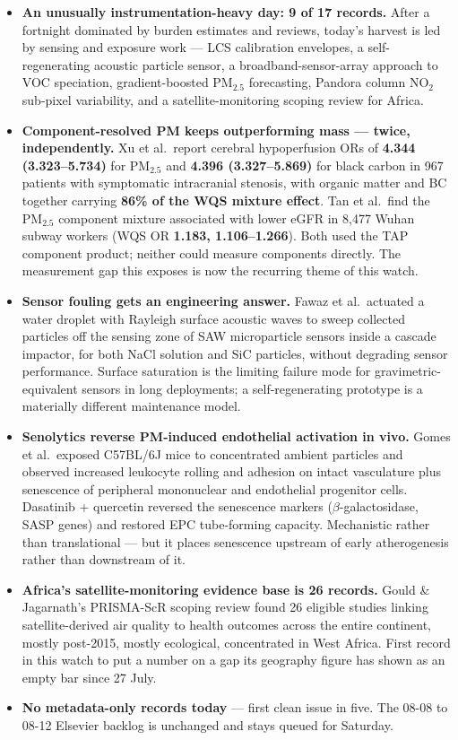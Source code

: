 \documentclass[10pt]{article}
\begin{document}
\footnotesize
\begin{itemize}
\item \textbf{An unusually instrumentation-heavy day: 9 of 17 records.} After a fortnight
dominated by burden estimates and reviews, today's harvest is led by sensing and exposure
work --- LCS calibration envelopes, a self-regenerating acoustic particle sensor, a
broadband-sensor-array approach to VOC speciation, gradient-boosted PM$_{2.5}$
forecasting, Pandora column NO$_2$ sub-pixel variability, and a satellite-monitoring
scoping review for Africa.

\item \textbf{Component-resolved PM keeps outperforming mass --- twice, independently.}
Xu et al.\ report cerebral hypoperfusion ORs of \textbf{4.344 (3.323--5.734)} for
PM$_{2.5}$ and \textbf{4.396 (3.327--5.869)} for black carbon in 967 patients with
symptomatic intracranial stenosis, with organic matter and BC together carrying
\textbf{86\% of the WQS mixture effect}. Tan et al.\ find the PM$_{2.5}$ component
mixture associated with lower eGFR in 8{,}477 Wuhan subway workers (WQS OR \textbf{1.183,
1.106--1.266}). Both used the TAP component product; neither could measure components
directly. The measurement gap this exposes is now the recurring theme of this watch.

\item \textbf{Sensor fouling gets an engineering answer.} Fawaz et al.\ actuated a water
droplet with Rayleigh surface acoustic waves to sweep collected particles off the sensing
zone of SAW microparticle sensors inside a cascade impactor, for both NaCl solution and
SiC particles, without degrading sensor performance. Surface saturation is the limiting
failure mode for gravimetric-equivalent sensors in long deployments; a self-regenerating
prototype is a materially different maintenance model.

\item \textbf{Senolytics reverse PM-induced endothelial activation in vivo.} Gomes et
al.\ exposed C57BL/6J mice to concentrated ambient particles and observed increased
leukocyte rolling and adhesion on intact vasculature plus senescence of peripheral
mononuclear and endothelial progenitor cells. Dasatinib + quercetin reversed the
senescence markers ($\beta$-galactosidase, SASP genes) and restored EPC tube-forming
capacity. Mechanistic rather than translational --- but it places senescence upstream of
early atherogenesis rather than downstream of it.

\item \textbf{Africa's satellite-monitoring evidence base is 26 records.} Gould \&
Jagarnath's PRISMA-ScR scoping review found 26 eligible studies linking satellite-derived
air quality to health outcomes across the entire continent, mostly post-2015, mostly
ecological, concentrated in West Africa. First record in this watch to put a number on a
gap its geography figure has shown as an empty bar since 27 July.

\item \textbf{No metadata-only records today} --- first clean issue in five. The 08-08 to
08-12 Elsevier backlog is unchanged and stays queued for Saturday.
\end{itemize}
\end{document}
